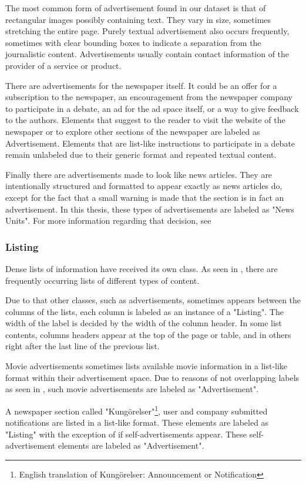 \documentclass[oneside, english, bibtex]{kththesis}
\begin{document}
The most common form of advertisement found in our dataset is that of rectangular images possibly containing text.
They vary in size, sometimes stretching the entire page.
Purely textual advertisement also occurs frequently, sometimes with clear bounding boxes to indicate a separation from the journalistic content.
Advertisements usually contain contact information of the provider of a service or product.

There are advertisements for the newspaper itself.
It could be an offer for a subscription to the newspaper,
an encouragement from the newspaper company to participate in a debate, an ad for the ad space itself,
or a way to give feedback to the authors. Elements that suggest to the reader to visit the website of the newspaper
or to explore other sections of the newspaper are labeled as Advertisement.
Elements that are list-like instructions to participate in a debate remain unlabeled due to their generic format and repeated textual content.

Finally there are advertisements made to look like news articles.
They are intentionally structured and formatted to appear exactly as news articles do,
except for the fact that a small warning is made that the section is in fact an advertisement.
In this thesis, these types of advertisements are labeled as "News Units". For more information regarding that decision, see 

\subsubsection{Listing}
\label{subsub:labellistings}
Dense lists of information have received its own class. As seen in ,
there are frequently occurring lists of different types of content.

Due to that other classes, such as advertisements, sometimes appears between the columns of the lists, each column is labeled as an instance of a "Listing".
The width of the label is decided by the width of the column header. In some list contents, columns headers appear at the top of the page or table,
and in others right after the last line of the previous list.

Movie advertisements sometimes lists available movie information in a list-like format within their advertisement space. Due to reasons of not overlapping labels as seen in , such movie advertisements are labeled as "Advertisement". 

A newspaper section called "Kungörelser"\footnote{English translation of Kungörelser: Announcement or Notification}, user and company submitted notifications are listed in a list-like format. These elements are labeled as "Listing" with the exception of if self-advertisements appear. These self-advertisement elements are labeled as "Advertisement".  
\end{document}
